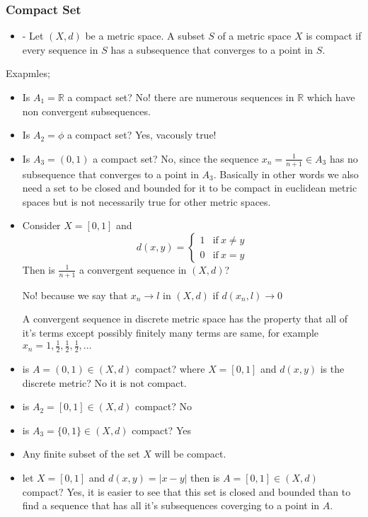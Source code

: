 \documentclass[12pt,a4paper]{article}
\begin{document}
  \subsubsection{Compact Set} 
\begin{itemize}
    \item - Let \((X, d)\) be a metric space. A subset \(S\) of a metric space \(X\) is compact if every sequence in \(S\) has a subsequence that converges to a point in \(S\).
\end{itemize}
Exapmles;
\begin{itemize}
    \item Is \(A_{1}=\mathbb{R}\) a compact set? No! there are numerous sequences in \(\mathbb{R}\) which have non convergent subsequences.
    \item Is \(A_{2}=\phi\) a compact set? Yes, vacously true!   
    \item Is \(A_{3}=(0,1)\) a compact set? No, since the sequence \(x_{n}=\frac{1}{n+1}\in A_{3}\) has no subsequence that converges to a point in \(A_{3}\). Basically in other words we also need a set to be closed and bounded for it to be compact in euclidean metric spaces but is not necessarily true for other metric spaces.
    \item Consider \(X=[0,1]\) and \[d(x,y)=\begin{cases} 1 & \text{if} \ x \neq y\\ 0 & \text{if} \ x=y \end{cases}\] Then is \(\frac{1}{n+1}\) a convergent sequence in \((X,d)\)? 
    
    No! because we say that \(x_{n}\to l\) in \((X,d)\) if \(d(x_{n},l) \to 0\)   
    
    A convergent sequence in discrete metric space has the property that all of it's terms except possibly finitely many terms are same, for example \(x_{n}= 1, \frac{1}{2},\frac{1}{2},\frac{1}{2},\ldots \)    
    \item is \(A=(0,1) \in (X,d)\) compact? where \(X=[0,1]\) and \(d(x,y)\) is the discrete metric? No it is not compact.
    \item is \(A_{2}=[0,1] \in (X,d)\) compact? No
    \item is \(A_{3}=\{0,1\} \in (X,d)\) compact? Yes
    \item Any finite subset of the set \(X\) will be compact.
    \item let \(X=[0,1]\) and \(d(x,y)=|x-y|\) then is \(A=[0,1] \in (X,d)\) compact?  Yes, it is easier to see that this set is closed and bounded than to find a sequence that has all it's subsequences coverging to a point in \(A\).                   
\end{itemize}
\end{document}
